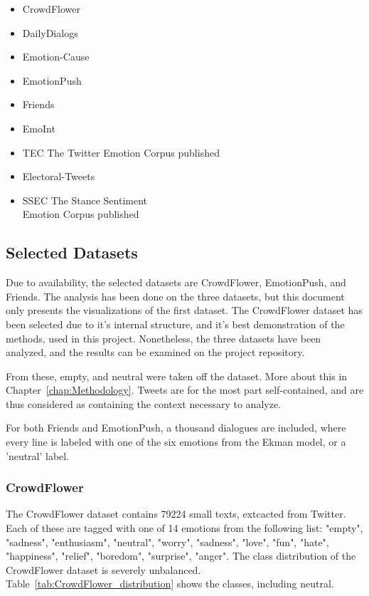 \begin{itemize}
  \item CrowdFlower %
  \item DailyDialogs~\cite{li2017dailydialog}
  \item Emotion-Cause~\cite{ghazi2015detecting}
  \item EmotionPush~\cite{huang2018emotionpush} %
  \item Friends~\cite{chen2018emotionlines} %
  \item EmoInt~\cite{MohammadB17starsem}
  \item TEC The Twitter Emotion Corpus published~\cite{mohammad2012emotional}
  \item Electoral-Tweets~\cite{mohammad2014semantic}
  \item SSEC The Stance Sentiment \\ Emotion Corpus published~\cite{schuff2017annotation}
\end{itemize}

\subsection{Selected Datasets}\label{sub:Selected Datasets}
Due to availability, the selected datasets are CrowdFlower, EmotionPush, and Friends. The analysis has been done on the three datasets, but this document only presents the visualizations of the first dataset. The CrowdFlower dataset has been selected due to it's internal structure, and it's best demonstration of the methods, used in this project. Nonetheless, the three datasets have been analyzed, and the results can be examined on the project repository.

From these, empty, and neutral were taken off the dataset. More about this in Chapter~\ref{chap:Methodology}. Tweets are for the most part self-contained, and are thus considered as containing the context necessary to analyze.

For both Friends and EmotionPush, a thousand dialogues are included, where every line is labeled with one of the six emotions from the Ekman model, or a 'neutral' label.

\subsubsection{CrowdFlower}
The CrowdFlower dataset contains 79224 small texts, extcacted from Twitter. Each of these are tagged with one of 14 emotions from the following list: "empty", "sadness", "enthusiasm", "neutral", "worry", "sadness", "love", "fun", "hate", "happiness", "relief", "boredom", "surprise", "anger".
The class distribution of the CrowdFlower dataset is severely unbalanced. Table~\ref{tab:CrowdFlower_distribution} shows the classes, including neutral.

